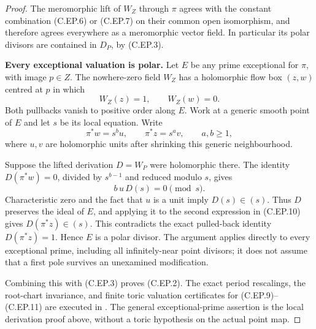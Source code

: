 \begin{proof}
The meromorphic lift of \(W_Z\) through \(\pi\)
agrees with the constant combination (C.EP.6)
or (C.EP.7) on their common open isomorphism,
and therefore agrees everywhere as a
meromorphic vector field. In particular its
polar divisors are contained in \(D_P\), by
(C.EP.3).

\par\medskip\noindent\textbf{Every exceptional valuation is polar.}
Let \(E\) be any prime exceptional for \(\pi\),
with image \(p\in Z\). The nowhere-zero field
\(W_Z\) has a holomorphic flow box \((z,w)\)
centred at \(p\) in which
\[
                   W_Z(z)=1,\qquad W_Z(w)=0.
 \tag{C.EP.9}
\]
Both pullbacks vanish to positive order along
\(E\). Work at a generic smooth point of \(E\)
and let \(s\) be its local equation. Write
\[
            \pi^*w=s^b u,\qquad
            \pi^*z=s^a v,\qquad a,b\ge1,
 \tag{C.EP.10}
\]
where \(u,v\) are holomorphic units after
shrinking this generic neighbourhood.

Suppose the lifted derivation \(D=W_P\) were
holomorphic there. The identity
\(D(\pi^*w)=0\), divided by \(s^{b-1}\) and
reduced modulo \(s\), gives
\[
                    b\,u\,D(s)=0\pmod{s}.
 \tag{C.EP.11}
\]
Characteristic zero and the fact that \(u\)
is a unit imply \(D(s)\in(s)\). Thus \(D\)
preserves the ideal of \(E\), and applying it
to the second expression in (C.EP.10) gives
\(D(\pi^*z)\in(s)\). This contradicts the
exact pulled-back identity \(D(\pi^*z)=1\).
Hence \(E\) is a polar divisor. The argument
applies directly to every exceptional prime,
including all infinitely-near point divisors;
it does not assume that a first pole survives
an unexamined modification.

Combining this with (C.EP.3) proves (C.EP.2).
The exact period rescalings, the root-chart
invariance, and finite toric valuation
certificates for (C.EP.9)--(C.EP.11) are
executed in .
The general exceptional-prime assertion is
the local derivation proof above, without a
toric hypothesis on the actual point map.
\end{proof}
